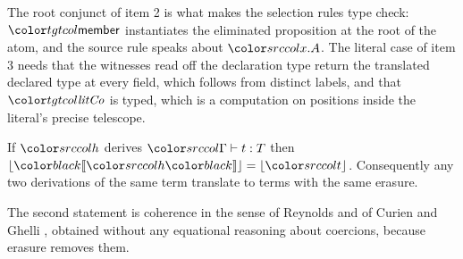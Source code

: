 The root conjunct of item 2 is what makes the selection rules type check: $\ev{member}$ instantiates the eliminated proposition at the root of the atom, and the source rule speaks about $\dsel{x}{A}$. The literal case of item 3 needs that the witnesses read off the declaration type return the translated declared type at every field, which follows from distinct labels, and that $\tgt{\mathit{litCo}}$ is typed, which is a computation on positions inside the literal's precise telescope.

\begin{theorem}[Erasure]\label{thm:trans-erase}
If $\src{h}$ derives $\dtyj{\Gamma}{t}{T}$ then $\erase{\trans{h}} = \erase{\src{t}}$. Consequently any two derivations of the same term translate to terms with the same erasure.
\end{theorem}

The second statement is coherence in the sense of Reynolds and of Curien and Ghelli \cite{curien1992coherence}, obtained without any equational reasoning about coercions, because erasure removes them.
